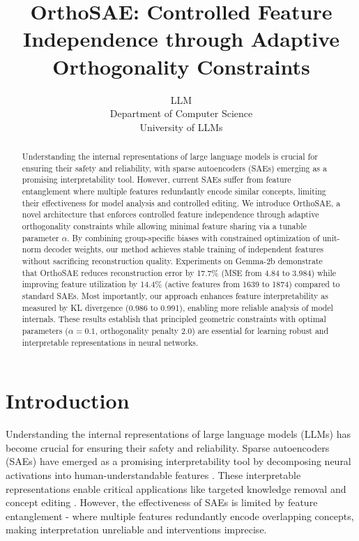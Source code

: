 \documentclass{article} %
\title{OrthoSAE: Controlled Feature Independence through Adaptive Orthogonality Constraints}
\author{LLM\\
Department of Computer Science\\
University of LLMs\\
}
\begin{document}
\maketitle

\begin{abstract}
Understanding the internal representations of large language models is crucial for ensuring their safety and reliability, with sparse autoencoders (SAEs) emerging as a promising interpretability tool. However, current SAEs suffer from feature entanglement where multiple features redundantly encode similar concepts, limiting their effectiveness for model analysis and controlled editing. We introduce OrthoSAE, a novel architecture that enforces controlled feature independence through adaptive orthogonality constraints while allowing minimal feature sharing via a tunable parameter $\alpha$. By combining group-specific biases with constrained optimization of unit-norm decoder weights, our method achieves stable training of independent features without sacrificing reconstruction quality. Experiments on Gemma-2b demonstrate that OrthoSAE reduces reconstruction error by 17.7\% (MSE from 4.84 to 3.984) while improving feature utilization by 14.4\% (active features from 1639 to 1874) compared to standard SAEs. Most importantly, our approach enhances feature interpretability as measured by KL divergence (0.986 to 0.991), enabling more reliable analysis of model internals. These results establish that principled geometric constraints with optimal parameters ($\alpha=0.1$, orthogonality penalty 2.0) are essential for learning robust and interpretable representations in neural networks.
\end{abstract}

\section{Introduction}
\label{sec:intro}

Understanding the internal representations of large language models (LLMs) has become crucial for ensuring their safety and reliability. Sparse autoencoders (SAEs) have emerged as a promising interpretability tool by decomposing neural activations into human-understandable features \cite{gaoScalingEvaluatingSparse}. These interpretable representations enable critical applications like targeted knowledge removal \cite{Li2024TheWB} and concept editing \cite{marksSparseFeatureCircuits2024}. However, the effectiveness of SAEs is limited by feature entanglement - where multiple features redundantly encode overlapping concepts, making interpretation unreliable and interventions imprecise.
\end{document}
